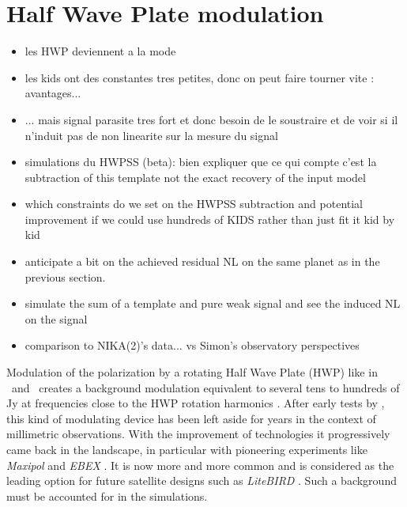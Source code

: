 
\section{Half Wave Plate modulation}

\begin{itemize}
\item les HWP deviennent a la mode
\item les kids ont des constantes tres petites, donc on peut faire tourner vite
  : avantages...
\item ... mais signal parasite tres fort et donc besoin de le soustraire et de
  voir si il n'induit pas de non linearite sur la mesure du signal
\item simulations du HWPSS (beta): bien expliquer que ce qui compte c'est la
  subtraction of this template not the exact recovery of the input model
\item which constraints do we set on the HWPSS subtraction and potential
  improvement if we could use hundreds of KIDS rather than just fit it kid by kid
\item anticipate a bit on the achieved residual NL on the same planet as in the
  previous section.
\item simulate the sum of a template and pure weak signal and see the induced NL
  on the signal
\item comparison to NIKA(2)'s data... vs Simon's observatory perspectives
\end{itemize}

{\color{blue}
Modulation of the polarization by a rotating Half Wave Plate (HWP) like in
\nika\ and \nikad\ creates a background modulation equivalent to several tens to
hundreds of Jy at frequencies close to the HWP rotation harmonics
\citep{2017A&A...599A..34R}. After early tests by , this kind of modulating device has been left aside for
 years in the context of millimetric observations. With the
improvement of technologies it progressively came back in the landscape, in
particular with pioneering experiments like \emph{Maxipol}
\citep{2007ApJ...665...42J} and \emph{EBEX} \citep{2010SPIE.7741E..1CR}. It is
now more and more common and is considered as the leading option for future
satellite designs such as \emph{LiteBIRD} . Such a background must
be accounted for in the simulations.}

